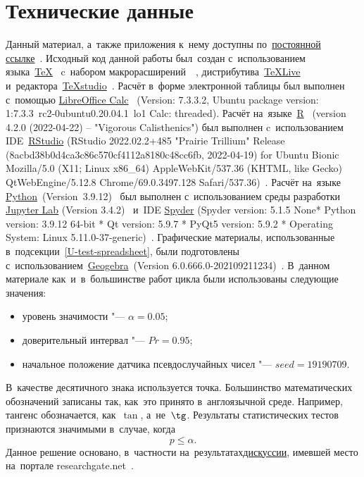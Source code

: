 \documentclass[]{scrartcl}
\begin{document}
\section{Технические данные}
Данный материал, а~также приложения к~нему доступны по~\href{https://github.com/Kirill-Murashev/AI_for_valuers_book/tree/main/Parts-Chapters/Mann-Whitney-Wilcoxon}{постоянной ссылке}~\cite{Murashev:u-test}. Исходный код данной работы был~создан с~использованием языка~\href{https://www.ctan.org/}{\TeX}~\cite{TeX:site} c~набором макрорасширений~\href{https://www.latex-project.org/}{\LaTeXe}~\cite{LaTeX:site}, дистрибутива~\href{https://www.tug.org/texlive/}{TeXLive}~\cite{TeXLive:site} и~редактора~\href{https://www.texstudio.org/}{TeXstudio}~\cite{TeXstudio:site}. Расчёт в~форме электронной таблицы был выполнен с~помощью \href{https://www.libreoffice.org/discover/calc/}{LibreOffice Calc}~\cite{LO:Calc} (Version: 7.3.3.2, Ubuntu package version: 1:7.3.3~rc2-0ubuntu0.20.04.1~lo1 Calc: threaded). Расчёт на~языке~\href{https://www.r-project.org/}{R}~\cite{R_language} (version 4.2.0 (2022-04-22) -- "Vigorous Calisthenics") был выполнен c~использованием IDE~\href{https://www.rstudio.com/}{RStudio} (RStudio 2022.02.2+485 "Prairie Trillium" Release (8acbd38b0d4ca3c86c570cf4112a8180c48cc6fb, 2022-04-19) for Ubuntu Bionic Mozilla/5.0 (X11; Linux x86\_64) AppleWebKit/537.36 (KHTML, like Gecko) QtWebEngine/5.12.8 Chrome/69.0.3497.128 Safari/537.36)~\cite{RStudio:official_site}. Расчёт на~языке \href{https://www.python.org/}{Python}~(Version~3.9.12)~\cite{Python:site} был выполнен с~использованием среды разработки \href{https://jupyter.org}{Jupyter Lab} (Version 3.4.2)~\cite{Jupyter:site} и~IDE \href{https://www.spyder-ide.org/}{Spyder} (Spyder version: 5.1.5 None* Python version: 3.9.12 64-bit * Qt version: 5.9.7 * PyQt5 version: 5.9.2
* Operating System: Linux 5.11.0-37-generic)~\cite{Spyder:site}. Графические материалы, использованные в~подсекции~\ref{U-test-spreadsheet}, были подготовлены с~использованием~\href{Geogebra:official-site}{Geogebra}~(Version 6.0.666.0-202109211234)~\cite{Geogebra:official-site}.
В~данном материале как~и~в~большинстве работ цикла были использованы следующие значения:
\begin{itemize}
	\item уровень значимости "--- $\alpha = 0.05$;
	\item доверительный интервал "--- $Pr = 0.95$;
	\item начальное положение датчика псевдослучайных чисел "--- $seed = 19190709$.
\end{itemize}
В~качестве десятичного знака используется точка. Большинство математических обозначений записаны так, как~это принято в~англоязычной среде. Например, тангенс обозначается, как~$\tan$, а~не~$\tg$. Результаты статистических тестов признаются значимыми в~случае, когда
\begin{equation}\label{eq:ignificance }
 p \leq \alpha.
\end{equation}
Данное решение основано, в~частности на~результатах\href{researchgate.net}{дискуссии}, имевшей место на~портале researchgate.net~\cite{RG:p-equals-alpha}.
%
\end{document}
